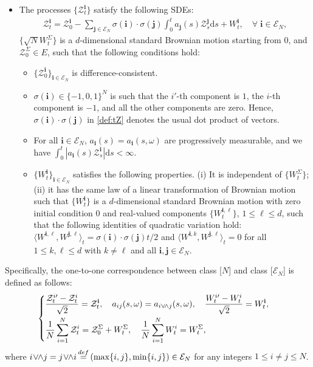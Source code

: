 \documentclass[10pt,a4paper]{amsart}
\newcommand{\bi}{\mathbf i}
\newcommand{\bj}{\mathbf j}
\newcommand{\bs}{\boldsymbol}
\renewcommand{\d}{{\mathrm d}}
\newcommand{\defeq}{{\stackrel{\rm def}{=}}}
\newcommand{\la}{{\langle}}
\newcommand{\mc}{\mathcal}
\newcommand{\ra}{{\rangle}}
\newcommand{\two}{{\sqrt{2}}}
\begin{document}
\begin{prop}
\begin{itemize}[leftmargin=1.2cm]
\item [{\bf [$ \mathbfcal{E}_{\bs N}$]}] The processes $\{\mc Z^\bi_t \}$ satisfy the following SDEs:
\begin{align}\label{def:tZ}
\mc Z^\bi_t=\mc Z^\bi_0-\sum_{\bj\in \mc E_N}\sigma(\bi)\cdot \sigma(\bj)\int_0^t a_\bj(s)\mc Z^\bj_s\d s+W^{\bi}_t,\quad \forall\;\bi\in \mc E_N,
\end{align}
$\{\sqrt{N}W^\Sigma_t \}$ is a $d$-dimensional standard Brownian motion starting from $0$, and $\mc Z^\Sigma_0\in E$, such that the following conditions hold:
\begin{itemize}
\item [$\bullet$] $\{\mc Z^\bi_0\}_{\bi\in \mc E_N}$ is difference-consistent.
\item [$\bullet$] $\sigma(\bi)\in \{-1,0,1\}^N$ is such that the $i\prime$-th component is $1$, the $i$-th component is $-1$, and all the other components are zero. Hence, $\sigma(\bi)\cdot\sigma(\bj)$ in \eqref{def:tZ} denotes the usual dot product of vectors.
\item [$\bullet$]  For all $\bi\in \mc E_N$, $a_{\bi}(s)=a_{\bi}(s,\omega)$ are progressively measurable, and we have $\int_0^t |a_{\bi}(s)\mc Z^\bi_s|\d s<\infty$.
\item [$\bullet$] $\{W^\bi_t \}_{\bi\in\mathcal E_N}$ satisfies the following properties. 
(i) It is independent of $\{W^\Sigma_t \}$; (ii) it has the same law of a linear transformation of Brownian motion such that $\{W^\bi_t \}$ is a $d$-dimensional standard Brownian motion with zero initial condition $0$ and real-valued components $\{W_t^{\bi,\ell}\}$, $1\leq \ell\leq d$, such that the following identities of quadratic variation hold:
$\la W^{\bi,\ell},W^{\bj,\ell}\ra_t=\sigma(\bi)\cdot \sigma(\bj)t/2$ and $
\la W^{\bi,k},W^{\bj,\ell}\ra_t=0$
for all $1\leq k, \ell\leq d$ with $k\neq \ell$ and all $\bi,\bj\in \mc E_N$.
\end{itemize}
\end{itemize}
Specifically, the one-to-one correspondence between class [$N$] and class [$\mathcal E_N$] is defined as follows: 
\begin{align}\label{def:bijective}
\begin{cases}
\displaystyle \frac{\mc Z_t^{i\prime}-\mc Z_t^i}{\two}=\mathcal Z_t^\bi,
\quad a_{ij}(s,\omega)=a_{i\vee\!\wedge j}(s,\omega),\quad \frac{W^{i\prime}_t-W^i_t}{\two}=W^{\bi}_t,\\
\vspace{-.4cm}\\
\displaystyle
\frac{1}{N}\sum_{i=1}^N \mc Z^i_t=\mc Z^\Sigma_0+W^\Sigma_t,\quad 
\frac{1}{N}\sum_{i=1}^N W^i_t=W^\Sigma_t,
\end{cases}
\end{align}
where $i\!\vee\!\!\wedge j=j\!\vee\!\!\wedge i\,\defeq\, 
(\max\{i,j\},\min\{i,j\})\in \mc E_N$ for any integers $1\leq i\neq j\leq N$.
\end{prop}
\end{document}
